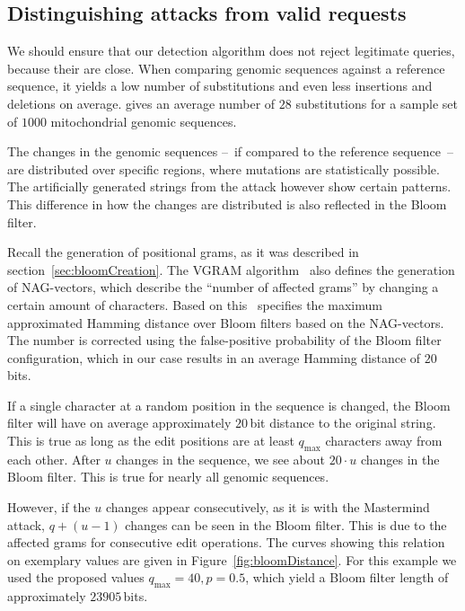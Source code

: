 \documentclass{llncs}
\begin{document}
\subsection{Distinguishing attacks from valid requests}
\label{sec:attackSeparation}

We should ensure that our detection algorithm does not reject legitimate queries, because their are close.
When comparing genomic sequences against a reference sequence, it yields a low
number of substitutions and even less insertions and deletions on average.
\cite{Goo09} gives an average number of $28$ substitutions for a sample set of
$1000$ mitochondrial genomic sequences. 



The changes in the genomic sequences --~if compared to the reference sequence~-- are distributed over specific regions, where mutations are statistically possible.
The artificially generated strings from the attack however show certain patterns.
This difference in how the changes are distributed is also reflected in the Bloom filter.

Recall the generation of positional grams, as it was described in section~\ref{sec:bloomCreation}.
The VGRAM algorithm~\cite{Li07} also defines the generation of NAG-vectors, which describe the ``number of affected grams'' by changing a certain amount of characters.
Based on this~\cite{BecKer12} specifies the maximum approximated Hamming distance over Bloom filters based on the NAG-vectors.
The number is corrected using the false-positive probability of the Bloom filter configuration, which in our case results in an average Hamming distance of $20$\,bits.

If a single character at a random position in the sequence is changed, the Bloom filter will have on average approximately $20$\,bit distance to the original string.
This is true as long as the edit positions are at least $q_{\text{max}}$ characters away from each other.
After $u$ changes in the sequence, we see about $20 \cdot u$ changes in the Bloom filter. This is true for nearly all genomic sequences.

However, if the $u$ changes appear consecutively, as it is with the Mastermind attack, $q + (u-1)$ changes can be seen in the Bloom filter.
This is due to the affected grams for consecutive edit operations. 
The curves showing this relation on exemplary values are given in Figure~\ref{fig:bloomDistance}.
For this example we used the proposed values $q_{\text{max}}=40, p=0.5$, which yield a Bloom filter length of approximately $23905$\,bits.
\end{document}
